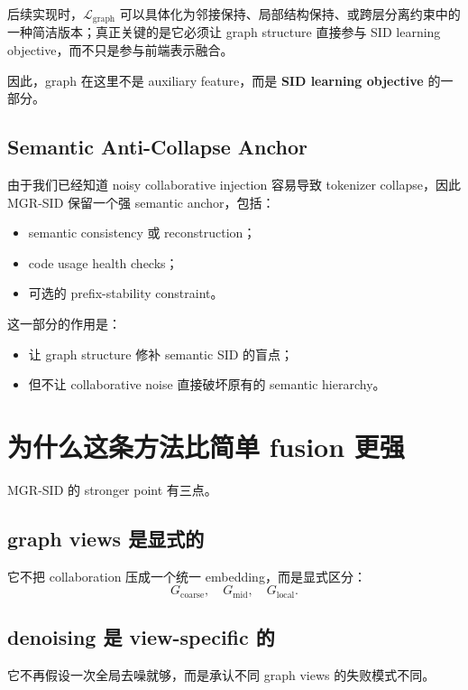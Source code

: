 \documentclass[11pt]{article}
\begin{document}
后续实现时，$\mathcal{L}_{\text{graph}}$ 可以具体化为邻接保持、局部结构保持、或跨层分离约束中的一种简洁版本；真正关键的是它必须让 graph structure 直接参与 SID learning objective，而不只是参与前端表示融合。

因此，graph 在这里不是 auxiliary feature，而是 \textbf{SID learning objective} 的一部分。

\subsection{Semantic Anti-Collapse Anchor}

由于我们已经知道 noisy collaborative injection 容易导致 tokenizer collapse，因此 MGR-SID 保留一个强 semantic anchor，包括：
\begin{itemize}
  \item semantic consistency 或 reconstruction；
  \item code usage health checks；
  \item 可选的 prefix-stability constraint。
\end{itemize}

这一部分的作用是：
\begin{itemize}
  \item 让 graph structure 修补 semantic SID 的盲点；
  \item 但不让 collaborative noise 直接破坏原有的 semantic hierarchy。
\end{itemize}

\section{为什么这条方法比简单 fusion 更强}

MGR-SID 的 stronger point 有三点。

\subsection{graph views 是显式的}

它不把 collaboration 压成一个统一 embedding，而是显式区分：
\[
G_{\text{coarse}},\quad G_{\text{mid}},\quad G_{\text{local}}.
\]

\subsection{denoising 是 view-specific 的}

它不再假设一次全局去噪就够，而是承认不同 graph views 的失败模式不同。
\end{document}
